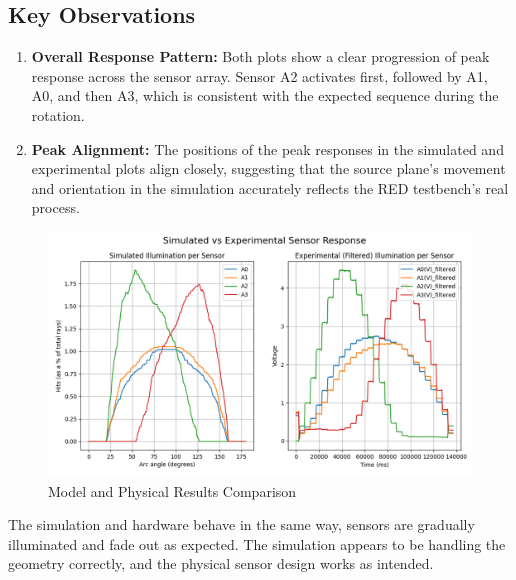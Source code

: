 \subsection*{Key Observations}
\begin{enumerate}
    \item \textbf{Overall Response Pattern:} Both plots show a clear progression of peak response across the sensor array. Sensor A2 activates first, followed by A1, A0, and then A3, which is consistent with the expected sequence during the rotation.
    
    \item \textbf{Peak Alignment:} The positions of the peak responses in the simulated and experimental plots align closely, suggesting that the source plane's movement and orientation in the simulation accurately reflects the RED testbench's real process.

\end{enumerate}
 \begin{landscape}
    \begin{figure}[htbp] %
        \centering
        \includegraphics[width=1.4\textwidth]{chapters/results/images/Comparison_plot.png} %
        \caption{Model and Physical Results Comparison}       %
        \label{fig:Model and Physical Results Comparison}            %
    \end{figure}
 \end{landscape}

The simulation and hardware behave in the same way, sensors are gradually illuminated and fade out as expected. The simulation appears to be handling the geometry correctly, and the physical sensor design works as intended.


